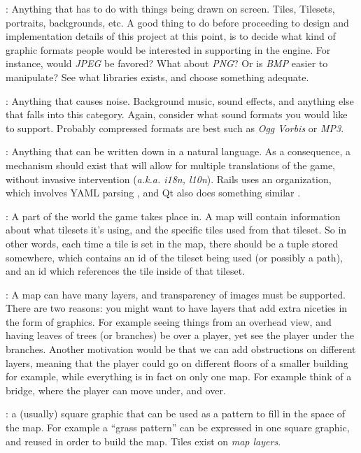 \begin{description}
  : Anything that has to do with things being drawn on screen.
    Tiles, Tilesets, portraits, backgrounds, etc. A good thing to do before
    proceeding to design and implementation details of this project at this
    point, is to decide what kind of graphic formats people would be interested
    in supporting in the engine. For instance, would \textit{JPEG} be favored?
    What about \textit{PNG}? Or is \textit{BMP} easier to manipulate? See what
    libraries exists, and choose something adequate.

  : Anything that causes noise. Background music, sound effects, and
    anything else that falls into this category. Again, consider what sound
    formats you would like to support. Probably compressed formats are best such
    as \textit{Ogg Vorbis} or \textit{MP3}.

  : Anything that can be written down in a natural language. As a
    consequence, a mechanism should exist that will allow for multiple
    translations of the game, without invasive intervention (\textit{a.k.a.
    i18n, l10n}). Rails uses an organization, which involves YAML parsing
    \cite{ruby:i18n}, and Qt also does something similar \cite{qt:i18n}.

  : A part of the world the game takes place in. A map will contain
    information about what tilesets it's using, and the specific tiles used from
    that tileset. So in other words, each time a tile is set in the map, there
    should be a tuple stored somewhere, which contains an id of the tileset being
    used (or possibly a path), and an id which references the tile inside of that
    tileset.

  : A map can have many layers, and transparency of images must
    be supported. There are two reasons: you might want to have layers that add
    extra niceties in the form of graphics. For example seeing things from an
    overhead view, and having leaves of trees (or branches) be over a player, yet
    see the player under the branches. Another motivation would be that we can add
    obstructions on different layers, meaning that the player could go on
    different floors of a smaller building for example, while everything is in
    fact on only one map. For example think of a bridge, where the player can move
    under, and over.

  : a (usually) square graphic that can be used as a pattern to fill
    in the space of the map. For example a ``grass pattern'' can be expressed in
    one square graphic, and reused in order to build the map. Tiles exist on
    \textit{map layers}.


\end{description}
